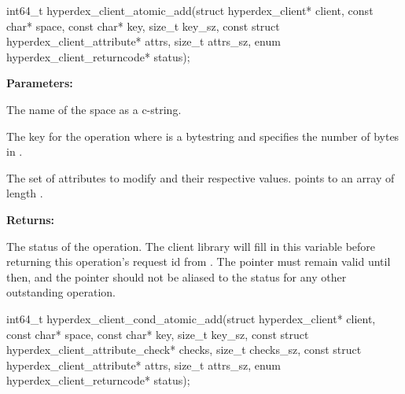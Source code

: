\funcsep
{}
\begin{ccode}
int64_t hyperdex_client_atomic_add(struct hyperdex_client* client,
                const char* space,
                const char* key, size_t key_sz,
                const struct hyperdex_client_attribute* attrs, size_t attrs_sz,
                enum hyperdex_client_returncode* status);
\end{ccode}
\funcdesc 

\noindent\textbf{Parameters:}
\begin{description}[labelindent=\widthof{{\code{attrs}, \code{attrs\_sz}}},leftmargin=*,noitemsep,nolistsep,align=right]
\item[\code{space}] The name of the space as a c-string.
\item[\code{key}, \code{key\_sz}] The key for the operation where  is a bytestring and  specifies the number of bytes in .
\item[\code{attrs}, \code{attrs\_sz}] The set of attributes to modify and their respective values.   points to an array of length .
\end{description}

\noindent\textbf{Returns:}
\begin{description}[labelindent=\widthof{{\code{status}}},leftmargin=*,noitemsep,nolistsep,align=right]
\item[\code{status}] The status of the operation.  The client library will fill in this variable before returning this operation's request id from .  The pointer must remain valid until then, and the pointer should not be aliased to the status for any other outstanding operation.
\end{description}

\funcsep
{}
\begin{ccode}
int64_t hyperdex_client_cond_atomic_add(struct hyperdex_client* client,
                const char* space,
                const char* key, size_t key_sz,
                const struct hyperdex_client_attribute_check* checks, size_t checks_sz,
                const struct hyperdex_client_attribute* attrs, size_t attrs_sz,
                enum hyperdex_client_returncode* status);
\end{ccode}
\funcdesc 

